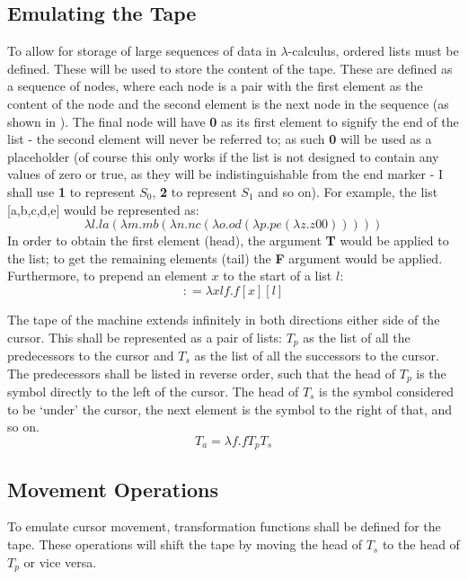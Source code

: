 \documentclass[Master.tex]{subfiles}
\begin{document}
\subsection{Emulating the Tape}\label{sec:LambdaUnivTape}
To allow for storage of large sequences of data in $\lambda$-calculus, ordered lists must be defined. These will be used to store the content of the tape. These are defined as a sequence of nodes, where each node is a pair with the first element as the content of the node and the second element is the next node in the sequence (as shown in \cite{tromp2007binary}). The final node will have \textbf{0} as its first element to signify the end of the list - the second element will never be referred to; as such \textbf{0} will be used as a placeholder (of course this only works if the list is not designed to contain any values of zero or true, as they will be indistinguishable from the end marker - I shall use \textbf{1} to represent $S_0$, \textbf{2} to represent $S_1$ and so on). For example, the list [a,b,c,d,e] would be represented as:
\begin{equation*}
\lambda l.la(\lambda m.mb(\lambda n.nc(\lambda o.od(\lambda p.pe(\lambda z.z\bm{\mathrm{00}})))))
\end{equation*}   
In order to obtain the first element (head), the argument \textbf{T} would be applied to the list; to get the remaining elements (tail) the \textbf{F} argument would be applied. 
Furthermore, to prepend an element $x$ to the start of a list $l$:
\begin{equation*}
\bm{\mathrm{:}} = \lambda xlf.f[x][l]
\end{equation*}
 
The tape of the machine extends infinitely in both directions either side of the cursor. This shall be represented as a pair of lists: $T_p$ as the list of all the predecessors to the cursor and $T_s$ as the list of all the successors to the cursor. The predecessors shall be listed in reverse order, such that the head of $T_p$ is the symbol directly to the left of the cursor. The head of $T_s$ is the symbol considered to be `under' the cursor, the next element is the symbol to the right of that, and so on.
\begin{equation*}
T_a = \lambda f.f T_p T_s
\end{equation*}

\subsection{Movement Operations}
To emulate cursor movement, transformation functions shall be defined for the tape. These operations will shift the tape by moving the head of $T_s$ to the head of $T_p$ or vice versa.
\end{document}
